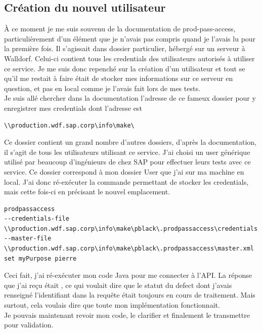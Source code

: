 \subsection{Création du nouvel utilisateur}
\`{A} ce moment je me suis souvenu de la documentation de prod-pass-access, particulièrement d'un élément que je n'avais pas compris quand je l'avais lu pour la première fois. Il s'agissait dans dossier particulier, hébergé sur un serveur à Walldorf. Celui-ci contient tous les credentials des utilisateurs autorisés à utiliser ce service. Je me suis donc repenché sur la création d'un utilisateur et tout se qu'il me restait à faire était de stocker mes informations sur ce serveur en question, et pas en local comme je l'avais fait lors de mes tests.\\
Je suis allé chercher dans la documentation l'adresse de ce fameux dossier pour y enregistrer mes credentials dont l'adresse est 

\begin{lstlisting}
\\production.wdf.sap.corp\info\make\
\end{lstlisting}

Ce dossier contient un grand nombre d'autres dossiers, d'après la documentation, il s'agit de tous les utilisateurs utilisant ce service. J'ai choisi un user générique  utilisé par beaucoup d'ingénieurs de chez SAP pour effectuer leurs tests avec ce service. Ce dossier correspond à mon dossier User que j'ai sur ma machine en local. J'ai donc ré-exécuter la commande permettant de stocker les credentials, mais cette fois-ci en précisant le nouvel emplacement.
\begin{lstlisting}
prodpassaccess 
--credentials-file \\production.wdf.sap.corp\info\make\pblack\.prodpassaccess\credentials.properties 
--master-file \\production.wdf.sap.corp\info\make\pblack\.prodpassaccess\master.xml 
set myPurpose pierre 
\end{lstlisting}

Ceci fait, j'ai ré-exécuter mon code \gls{Java} pour me connecter à l'API. La réponse que j'ai reçu était , ce qui voulait dire que le statut du defect dont j'avais renseigné l'identifiant dans la requête était toujours en cours de traitement. Mais surtout, cela voulais dire que toute mon implémentation fonctionnait. \\
Je pouvais maintenant revoir mon code, le clarifier et finalement le transmettre pour validation.\\


